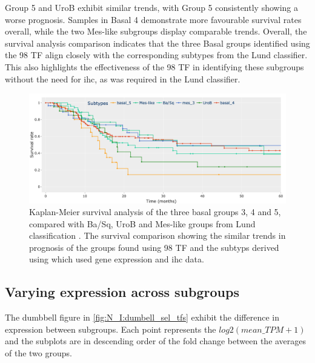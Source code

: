Group 5 and UroB exhibit similar trends, with Group 5 consistently showing a worse prognosis. Samples in Basal 4 demonstrate more favourable survival rates overall, while the two Mes-like subgroups display comparable trends. Overall, the survival analysis comparison indicates that the three Basal groups identified using the 98 TF align closely with the corresponding subtypes from the Lund classifier. This also highlights the effectiveness of the 98 TF in identifying these subgroups without the need for \acrlong{ihc}, as was required in the Lund classifier.


\begin{figure}[!htb]
    \centering
    \includegraphics[width=1.0\textwidth,keepaspectratio]{Sections/Network_I/Resources/selective_pruning/comp_leiden_survival.png}
    \caption[Basal 5 and UroB low survival prognosis]{Kaplan-Meier survival analysis of the three basal groups 3, 4 and 5, compared with Ba/Sq, UroB and Mes-like groups from Lund classification \citep{Marzouka2018-ge}. The survival comparison showing the similar trends in prognosis of the groups found using 98 TF and the subtyps derived using \citet{Marzouka2018-ge} which used gene expression and \acrlong{ihc} data. }
    \label{fig:N_I:sel_tfs_comp_leiden}
\end{figure} 




\subsection{Varying expression across subgroups} \label{s:N_I:sel_tfs_ge}

The dumbbell figure in \cref{fig:N_I:dumbell_sel_tfs} exhibit the difference in expression between subgroups. Each point represents the $log2(mean\_TPM+1)$ and the subplots are in descending order of the fold change between the averages of the two groups.

